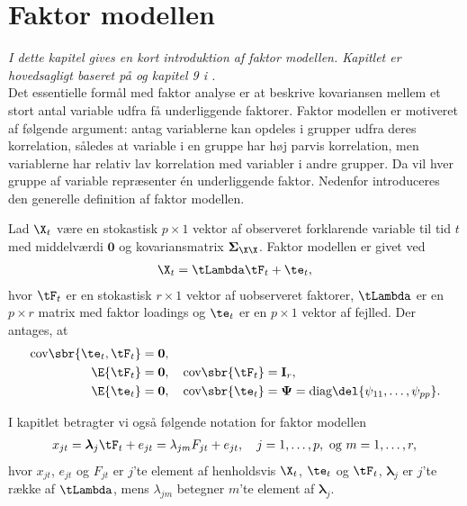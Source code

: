 \chapter{Faktor modellen}
\textit{I dette kapitel gives en kort introduktion af faktor modellen. Kapitlet er hovedsagligt baseret på \citep{stock_watson_2002a} og kapitel 9 i \citep{faktorbook}.} \\[2mm]
%
Det essentielle formål med faktor analyse er at beskrive kovariansen mellem et stort antal variable udfra få underliggende faktorer.
Faktor modellen er motiveret af følgende argument: antag variablerne kan opdeles i grupper udfra deres korrelation, således at variable i en gruppe har høj parvis korrelation, men variablerne har relativ lav korrelation med variabler i andre grupper.
Da vil hver gruppe af variable repræsenter én underliggende faktor.
Nedenfor introduceres den generelle definition af faktor modellen.
%
\begin{defn} \label{def:faktor_model}
Lad \(\X_t\) være en stokastisk \(p \times 1\) vektor af observeret forklarende variable til tid \(t\) med middelværdi \(\mathbf{0}\) og kovariansmatrix \(\boldsymbol{\Sigma}_{\X \X}\).
Faktor modellen er givet ved
\begin{align}
\X_t = \tLambda \tF_t + \te_t, \label{eq:factor_model}
\end{align}
hvor \(\tF_t\) er en stokastisk \(r \times 1\) vektor af uobserveret faktorer, \(\tLambda\) er en \(p \times r\) matrix med faktor loadings og \(\te_t\) er en \(p \times 1\) vektor af fejlled.
Der antages, at
\begin{align*}
\text{cov} \sbr{\te_t, \tF_t} &= \mathbf{0}, \\
\E{\tF_t} &= \mathbf{0}, \quad \text{cov}\sbr{\tF_t} = \mathbf{I}_r, \\
\E{\te_t} &= \mathbf{0}, \quad \text{cov}\sbr{\te_t} = \boldsymbol{\Psi} = \text{diag} \del{\psi_{11}, \ldots, \psi_{pp}}.
\end{align*}
\end{defn}
%
I kapitlet betragter vi også følgende notation for faktor modellen
\begin{align*}
x_{jt} = \boldsymbol{\lambda}_j \tF_t + e_{jt} = \lambda_{jm}F_{jt} + e_{jt}, \quad j = 1, \ldots, p, \text{ og } m = 1, \ldots, r,
\end{align*} 
hvor \(x_{jt}\), \( e_{jt}\) og \(F_{jt}\) er \(j\)'te element af henholdsvis \(\X_t\), \(\te_t\) og \(\tF_t\), \(\boldsymbol{\lambda}_j \) er \(j\)'te række af \(\tLambda\), mens \(\lambda_{jm}\) betegner \(m\)'te element af \(\boldsymbol{\lambda}_j \).
